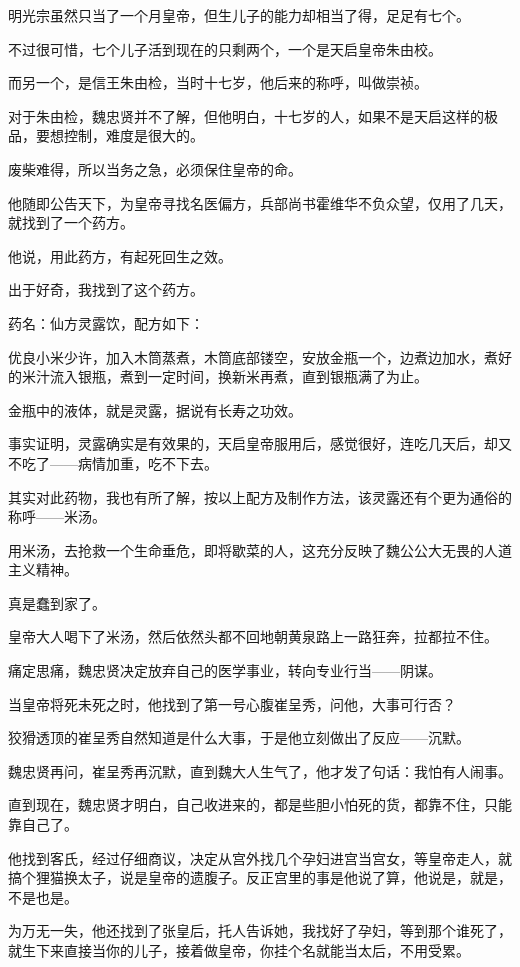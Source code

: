 \begin{multicols}{\theparacolNo}
明光宗虽然只当了一个月皇帝，但生儿子的能力却相当了得，足足有七个。

不过很可惜，七个儿子活到现在的只剩两个，一个是天启皇帝朱由校。

而另一个，是信王朱由检，当时十七岁，他后来的称呼，叫做崇祯。

对于朱由检，魏忠贤并不了解，但他明白，十七岁的人，如果不是天启这样的极品，要想控制，难度是很大的。

废柴难得，所以当务之急，必须保住皇帝的命。

他随即公告天下，为皇帝寻找名医偏方，兵部尚书霍维华不负众望，仅用了几天，就找到了一个药方。

他说，用此药方，有起死回生之效。

出于好奇，我找到了这个药方。

药名：仙方灵露饮，配方如下：

优良小米少许，加入木筒蒸煮，木筒底部镂空，安放金瓶一个，边煮边加水，煮好的米汁流入银瓶，煮到一定时间，换新米再煮，直到银瓶满了为止。

金瓶中的液体，就是灵露，据说有长寿之功效。

事实证明，灵露确实是有效果的，天启皇帝服用后，感觉很好，连吃几天后，却又不吃了——病情加重，吃不下去。

其实对此药物，我也有所了解，按以上配方及制作方法，该灵露还有个更为通俗的称呼——米汤。

用米汤，去抢救一个生命垂危，即将歇菜的人，这充分反映了魏公公大无畏的人道主义精神。

真是蠢到家了。

皇帝大人喝下了米汤，然后依然头都不回地朝黄泉路上一路狂奔，拉都拉不住。

痛定思痛，魏忠贤决定放弃自己的医学事业，转向专业行当——阴谋。

当皇帝将死未死之时，他找到了第一号心腹崔呈秀，问他，大事可行否？

狡猾透顶的崔呈秀自然知道是什么大事，于是他立刻做出了反应——沉默。

魏忠贤再问，崔呈秀再沉默，直到魏大人生气了，他才发了句话：我怕有人闹事。

直到现在，魏忠贤才明白，自己收进来的，都是些胆小怕死的货，都靠不住，只能靠自己了。

他找到客氏，经过仔细商议，决定从宫外找几个孕妇进宫当宫女，等皇帝走人，就搞个狸猫换太子，说是皇帝的遗腹子。反正宫里的事是他说了算，他说是，就是，不是也是。

为万无一失，他还找到了张皇后，托人告诉她，我找好了孕妇，等到那个谁死了，就生下来直接当你的儿子，接着做皇帝，你挂个名就能当太后，不用受累。


\end{multicols}
